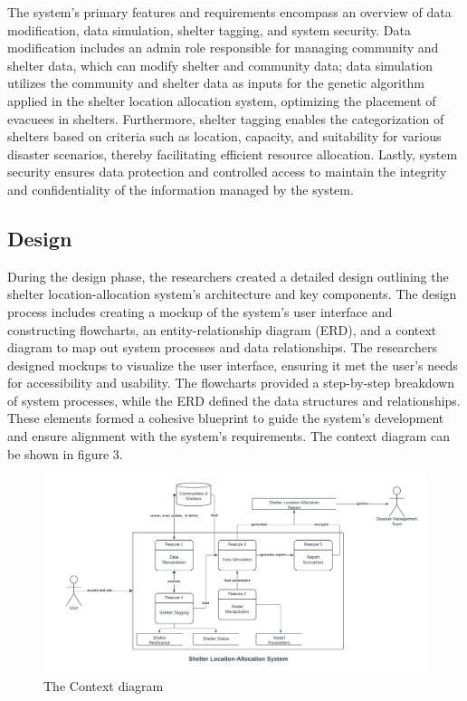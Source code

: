 	The system's primary features and requirements encompass an overview of data modification, data simulation, shelter tagging, and system security. Data modification includes an admin role responsible for managing community and shelter data, which can modify shelter and community data; data simulation utilizes the community and shelter data as inputs for the genetic algorithm applied in the shelter location allocation system, optimizing the placement of evacuees in shelters. Furthermore, shelter tagging enables the categorization of shelters based on criteria such as location, capacity, and suitability for various disaster scenarios, thereby facilitating efficient resource allocation. Lastly, system security ensures data protection and controlled access to maintain the integrity and confidentiality of the information managed by the system.

\subsection{Design}
	During the design phase, the researchers created a detailed design outlining the shelter location-allocation system's architecture and key components. The design process includes creating a mockup of the system's user interface and constructing flowcharts, an entity-relationship diagram (ERD), and a context diagram to map out system processes and data relationships. The researchers designed mockups to visualize the user interface, ensuring it met the user's needs for accessibility and usability. The flowcharts provided a step-by-step breakdown of system processes, while the ERD defined the data structures and relationships. These elements formed a cohesive blueprint to guide the system's development and ensure alignment with the system's requirements. The context diagram can be shown in figure 3.

	\begin{figure}[h!]
		\caption{The Context diagram}
		\centering
		\includegraphics[width=\textwidth]{Context Diagram}
	\end{figure}
	
